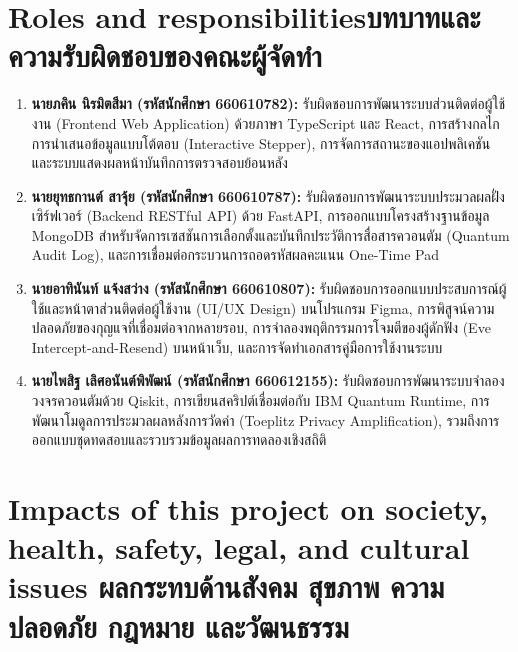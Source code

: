 \section{\ifenglish Roles and responsibilities\else บทบาทและความรับผิดชอบของคณะผู้จัดทำ\fi}
\begin{enumerate}
    \item \textbf{นายภคิน นิรมิตสีมา (รหัสนักศึกษา 660610782):} รับผิดชอบการพัฒนาระบบส่วนติดต่อผู้ใช้งาน (Frontend Web Application) ด้วยภาษา TypeScript และ React, การสร้างกลไกการนำเสนอข้อมูลแบบโต้ตอบ (Interactive Stepper), การจัดการสถานะของแอปพลิเคชัน และระบบแสดงผลหน้าบันทึกการตรวจสอบย้อนหลัง
    \item \textbf{นายยุทธกานต์ สาจุ้ย (รหัสนักศึกษา 660610787):} รับผิดชอบการพัฒนาระบบประมวลผลฝั่งเซิร์ฟเวอร์ (Backend RESTful API) ด้วย FastAPI, การออกแบบโครงสร้างฐานข้อมูล MongoDB สำหรับจัดการเซสชันการเลือกตั้งและบันทึกประวัติการสื่อสารควอนตัม (Quantum Audit Log), และการเชื่อมต่อกระบวนการถอดรหัสผลคะแนน One-Time Pad
    \item \textbf{นายอาทินันท์ แจ้งสว่าง (รหัสนักศึกษา 660610807):} รับผิดชอบการออกแบบประสบการณ์ผู้ใช้และหน้าตาส่วนติดต่อผู้ใช้งาน (UI/UX Design) บนโปรแกรม Figma, การพิสูจน์ความปลอดภัยของกุญแจที่เชื่อมต่อจากหลายรอบ, การจำลองพฤติกรรมการโจมตีของผู้ดักฟัง (Eve Intercept-and-Resend) บนหน้าเว็บ, และการจัดทำเอกสารคู่มือการใช้งานระบบ
    \item \textbf{นายไพสิฐ เลิศอนันต์พิพัฒน์ (รหัสนักศึกษา 660612155):} รับผิดชอบการพัฒนาระบบจำลองวงจรควอนตัมด้วย Qiskit, การเขียนสคริปต์เชื่อมต่อกับ IBM Quantum Runtime, การพัฒนาโมดูลการประมวลผลหลังการวัดค่า (Toeplitz Privacy Amplification), รวมถึงการออกแบบชุดทดสอบและรวบรวมข้อมูลผลการทดลองเชิงสถิติ
\end{enumerate}

\section{\ifenglish%
Impacts of this project on society, health, safety, legal, and cultural issues
\else%
ผลกระทบด้านสังคม สุขภาพ ความปลอดภัย กฎหมาย และวัฒนธรรม
\fi}

